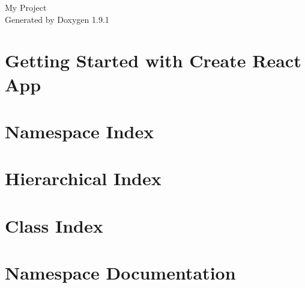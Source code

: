 \let\mypdfximage\pdfximage\def\pdfximage{\immediate\mypdfximage}\documentclass[twoside]{book}
\newcommand{\+}{\discretionary{\mbox{\scriptsize$\hookleftarrow$}}{}{}}
\newcommand{\clearemptydoublepage}{%
  \newpage{\pagestyle{empty}\cleardoublepage}%
}
\begin{document}
\raggedbottom

\hypersetup{pageanchor=false,
             bookmarksnumbered=true,
             pdfencoding=unicode
            }
\begin{titlepage}
\vspace*{7cm}
\begin{center}%
{\Large My Project }\\
\vspace*{1cm}
{\large Generated by Doxygen 1.9.1}\\
\end{center}
\end{titlepage}
\clearemptydoublepage
{}
\tableofcontents
\clearemptydoublepage
{}
\hypersetup{pageanchor=true}

\chapter{Getting Started with Create React App}
\label{md__c___users_vladh_source_repos__activities_client__r_e_a_d_m_e}

\chapter{Namespace Index}

\chapter{Hierarchical Index}

\chapter{Class Index}

\chapter{Namespace Documentation}































\end{document}
